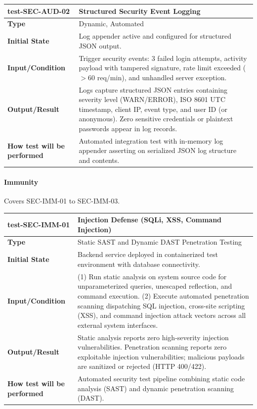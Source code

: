 \documentclass[12pt, titlepage]{article}
\begin{document}
\vspace{1em}

\noindent\begin{tabularx}{\textwidth}{>{\raggedright\arraybackslash}p{3.5cm}X}
  \toprule
  \textbf{test-SEC-AUD-02} & \textbf{Structured Security Event Logging}\\
  \midrule
  \textbf{Type} & Dynamic, Automated\\
  \textbf{Initial State} & Log appender active and configured for structured JSON output.\\
  \textbf{Input/Condition} & Trigger security events: 3 failed login attempts, activity payload with tampered signature, rate limit exceeded ($> 60$ req/min), and unhandled server exception.\\
  \textbf{Output/Result} & Logs capture structured JSON entries containing severity level (WARN/ERROR), ISO 8601 UTC timestamp, client IP, event type, and user ID (or anonymous). Zero sensitive credentials or plaintext passwords appear in log records.\\
  \textbf{How test will be performed} & Automated integration test with in-memory log appender asserting on serialized JSON log structure and contents.\\
  \bottomrule
\end{tabularx}

\paragraph{Immunity}

Covers SEC-IMM-01 to SEC-IMM-03.

\noindent\begin{tabularx}{\textwidth}{>{\raggedright\arraybackslash}p{3.5cm}X}
  \toprule
  \textbf{test-SEC-IMM-01} & \textbf{Injection Defense (SQLi, XSS, Command Injection)}\\
  \midrule
  \textbf{Type} & Static SAST and Dynamic DAST Penetration Testing\\
  \textbf{Initial State} & Backend service deployed in containerized test environment with database connectivity.\\
  \textbf{Input/Condition} & (1) Run static analysis on system source code for unparameterized queries, unescaped reflection, and command execution. (2) Execute automated penetration scanning dispatching SQL injection, cross-site scripting (XSS), and command injection attack vectors across all external system interfaces.\\
  \textbf{Output/Result} & Static analysis reports zero high-severity injection vulnerabilities. Penetration scanning reports zero exploitable injection vulnerabilities; malicious payloads are sanitized or rejected (HTTP 400/422).\\
  \textbf{How test will be performed} & Automated security test pipeline combining static code analysis (SAST) and dynamic penetration scanning (DAST).\\
  \bottomrule
\end{tabularx}
\end{document}
